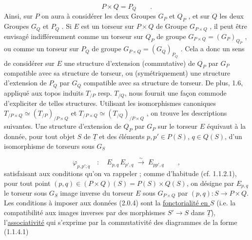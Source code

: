 \begin{equation}\tag{2.0.3}
P\times Q = P_Q \qquad .
\end{equation}
Ainsi, sur $P$ on  aura à considérer les deux Groupes $G_P$ et $Q_P$ , et sur $Q$ les deux Groupes $G_Q$ et $P_Q$ . Si $E$ est un torseur sur $P\times Q$ de Groupe $G_{P\times Q}$ , il peut être envisagé indifféremment comme un torseur sur $Q_P$ de groupe $G_{P\times Q} = (G_P)_{Q_P}$ , ou comme un torseur sur $P_Q$ de groupe $G_{P\times Q}=(G_Q)_{P_Q}$ . Cela a donc un sens de considérer sur $E$ une structure d'extension (commutative) de $Q_P$ par $G_P$ compatible avec sa structure de torseur, ou (symétriquement)
une structure d'extension de $P_Q$ par $G_Q$ compatible avec sa structure de torseur. De plus, 1.6, appliqué aux topos induits $T_{/P}$ resp. $T_{/Q}$, nous fournit une façon commode d'expliciter de telles structures. Utilisant les isomorphismes canoniques $T_{/P\times Q} \simeq (T_{/P})_{/P\times Q}$ et $T_{/P\times Q} \simeq (T_{/Q})_{/P\times Q}$ , on trouve les descriptions suivantes. Une structure d'extension de $Q_P$ par $G_P$ sur le torseur $E$ équivaut à la donnée, pour tout objet $S$ de $\underline{T}$ et des éléments $p,p' \in P(S)$, $q \in Q(S)$, d'un isomorphisme de torseurs sous $G_S$

\begin{equation}\tag{2.0.4}
\varphi_{p,p';q} \quad : \quad E_{p,q}\,E_{p',q} \;\overset{\sim}{\longrightarrow}\; E_{pp',q} \qquad ,
\end{equation}
satisfaisant aux conditions qu'on va rappeler ; comme d'habitude (cf. 1.1.2.1), pour tout point $(p,q) \in (P\times Q)(S) = P(S)\times Q(S)$, on désigne par $E_{p,q}$ le torseur sous $G_S$ image inverse du torseur $E$ sous $G_{P\times Q}$ par $(p,q) : S \longrightarrow P\times Q$. Les conditions à imposer aux données (2.0.4) sont la \underline{fonctorialité en $S$} (i.e. la compatibilité aux images inverses par des morphismes $S' \longrightarrow S$ dans $\underline{T}$), l'\underline{associativité} qui s'exprime par la commutativité des diagrammes de la forme (1.1.4.1)

